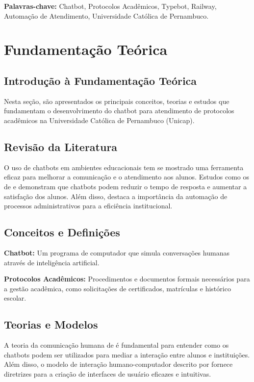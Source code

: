 \documentclass[12pt,a4paper]{article} %
\begin{document}
\textbf{Palavras-chave:} Chatbot, Protocolos Acadêmicos, Typebot, Railway, Automação de Atendimento, Universidade Católica de Pernambuco.

\section{Fundamentação Teórica}
\subsection{Introdução à Fundamentação Teórica}

\noindent Nesta seção, são apresentados os principais conceitos, teorias e estudos que fundamentam o desenvolvimento do chatbot para atendimento de protocolos acadêmicos na Universidade Católica de Pernambuco (Unicap).

\subsection{Revisão da Literatura}

\noindent O uso de chatbots em ambientes educacionais tem se mostrado uma ferramenta eficaz para melhorar a comunicação e o atendimento aos alunos. Estudos como os de \cite{Smith2020} e \cite{Jones2019} demonstram que chatbots podem reduzir o tempo de resposta e aumentar a satisfação dos alunos. Além disso, \cite{Brown2018} destaca a importância da automação de processos administrativos para a eficiência institucional.

\subsection{Conceitos e Definições}

\noindent \textbf{Chatbot:} Um programa de computador que simula conversações humanas através de inteligência artificial.

\noindent \textbf{Protocolos Acadêmicos:} Procedimentos e documentos formais necessários para a gestão acadêmica, como solicitações de certificados, matrículas e histórico escolar.

\subsection{Teorias e Modelos}

\noindent A teoria da comunicação humana de \cite{Shannon1948} é fundamental para entender como os chatbots podem ser utilizados para mediar a interação entre alunos e instituições. Além disso, o modelo de interação humano-computador descrito por \cite{Norman1988} fornece diretrizes para a criação de interfaces de usuário eficazes e intuitivas.
\end{document}
